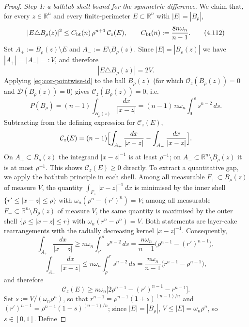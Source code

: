 \documentclass[11pt]{amsart}
\theoremstyle{definition}
\newcommand{\R}{\mathbb R}
\newcommand{\Per}{P}
\newcommand{\osc}{\mathcal O}
\newcommand{\Def}{\mathcal D}
\begin{document}
\begin{proof}
\smallskip
\noindent\emph{Step 1: a bathtub shell bound for the symmetric difference.}
We claim that, for every \(z\in\R^n\) and every finite-perimeter
\(E\subset\R^n\) with \(|E|=|B_\rho|\),
\begin{equation}\label{eq:cor-bathtub}
   |E\triangle B_\rho(z)|^2
       \le C_{\rm bt}(n)\,\rho^{n+1}\,\mathcal C_z(E),
   \qquad
   C_{\rm bt}(n):=\frac{8n\omega_n}{n-1}.
\tag{4.112}
\end{equation}
Set \(A_+:=B_\rho(z)\setminus E\) and \(A_-:=E\setminus B_\rho(z)\).
Since \(|E|=|B_\rho(z)|\) we have \(|A_+|=|A_-|=:V\), and therefore
\[
   |E\triangle B_\rho(z)|=2V.
\]
Applying \eqref{eq:cor-pointwise-id} to the ball \(B_\rho(z)\) (for which
\(\osc_z(B_\rho(z))=0\) and \(\Def(B_\rho(z))=0\)) gives
\(\mathcal C_z(B_\rho(z))=0\), i.e.
\[
   \Per(B_\rho)=(n-1)\int_{B_\rho(z)}\frac{dx}{|x-z|}
              =(n-1)\,n\omega_n\int_0^{\rho}s^{n-2}\,ds.
\]
Subtracting from the defining expression for \(\mathcal C_z(E)\),
\[
   \mathcal C_z(E)
   =(n-1)\Bigl[\int_{A_+}\frac{dx}{|x-z|}-\int_{A_-}\frac{dx}{|x-z|}\Bigr].
\]
On \(A_+\subset B_\rho(z)\) the integrand \(|x-z|^{-1}\) is at least
\(\rho^{-1}\); on \(A_-\subset\R^n\setminus B_\rho(z)\) it is at most
\(\rho^{-1}\).  This shows \(\mathcal C_z(E)\ge0\) directly.  To
extract a quantitative gap, we apply the bathtub principle in each shell.
Among all measurable \(F_+\subset B_\rho(z)\) of measure \(V\), the
quantity \(\int_{F_+}|x-z|^{-1}\,dx\) is minimised by the inner shell
\(\{r'\le|x-z|\le\rho\}\) with \(\omega_n(\rho^n-(r')^n)=V\); among all
measurable \(F_-\subset\R^n\setminus B_\rho(z)\) of measure \(V\), the
same quantity is maximised by the outer shell
\(\{\rho\le|x-z|\le r\}\) with \(\omega_n(r^n-\rho^n)=V\).
Both statements are layer-cake rearrangements with the
radially decreasing kernel \(|x-z|^{-1}\).  Consequently,
\[
   \int_{A_+}\frac{dx}{|x-z|}\ge
      n\omega_n\int_{r'}^{\rho}s^{n-2}\,ds
      =\frac{n\omega_n}{n-1}\bigl(\rho^{n-1}-(r')^{n-1}\bigr),
\]
\[
   \int_{A_-}\frac{dx}{|x-z|}\le
      n\omega_n\int_{\rho}^{r}s^{n-2}\,ds
      =\frac{n\omega_n}{n-1}\bigl(r^{n-1}-\rho^{n-1}\bigr),
\]
and therefore
\begin{equation}\label{eq:cor-Cz-shell}
   \mathcal C_z(E)
   \ge n\omega_n
       \bigl[2\rho^{n-1}-(r')^{n-1}-r^{n-1}\bigr].
\tag{4.113}
\end{equation}
Set \(s:=V/(\omega_n\rho^n)\), so that
\(r^{n-1}=\rho^{n-1}(1+s)^{(n-1)/n}\) and
\((r')^{n-1}=\rho^{n-1}(1-s)^{(n-1)/n}\); since \(|E|=|B_\rho|\),
\(V\le|E|=\omega_n\rho^n\), so \(s\in[0,1]\).  Define

\end{proof}
\end{document}
